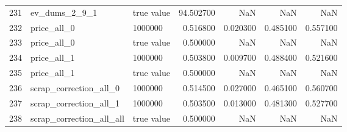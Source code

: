 \begin{tabular}{lllrrrr}
231 & ev_dums_2_9_1 & true value & 94.502700 & NaN & NaN & NaN \\
232 & price_all_0 & 1000000 & 0.516800 & 0.020300 & 0.485100 & 0.557100 \\
233 & price_all_0 & true value & 0.500000 & NaN & NaN & NaN \\
234 & price_all_1 & 1000000 & 0.503800 & 0.009700 & 0.488400 & 0.521600 \\
235 & price_all_1 & true value & 0.500000 & NaN & NaN & NaN \\
236 & scrap_correction_all_0 & 1000000 & 0.514500 & 0.027000 & 0.465100 & 0.560700 \\
237 & scrap_correction_all_1 & 1000000 & 0.503500 & 0.013000 & 0.481300 & 0.527700 \\
238 & scrap_correction_all_all & true value & 0.500000 & NaN & NaN & NaN \\
\bottomrule
\end{tabular}

